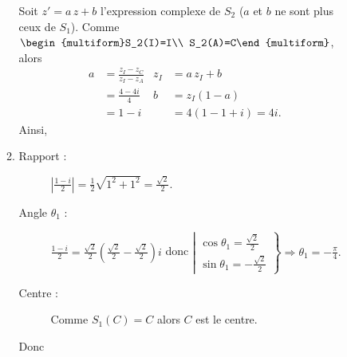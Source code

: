 \begin{description}
\begin{enumerate}
\begin{enumerate}
												Soit $z' = a\, z + b$ l'expression complexe de $S_2$ ($a$ et $b$ ne sont plus ceux de $S_1$).
												Comme 
												$\begin{multiform}S_2(I)=I\\ S_2(A)=C\end{multiform}$, 
												alors
												\begin{align*}
												a	& = \frac{z_I - z_C}{z_I - z_A}		& z_I & = a \, z_I + b 		\\
													& = \frac{4-4i}{4}							& b 	& = z_I ( 1 - a)		\\
													& = 1-i										&  		& = 4 (1-1+i) = 4i		.
												\end{align*}
												Ainsi, 
									\item {}\vspace{-1\baselineskip}
												\begin{description}
													\item[Rapport :] 
														$\left|\frac{1-i}{2}\right| = \frac{1}{2}\sqrt{1^2 + 1^2} = \frac{\sqrt{2}}{2}$.
													\item[Angle $\theta_1$ :]
														$\frac{1-i}{2}=\frac{\sqrt{2}}{2}\left(\frac{\sqrt{2}}{2}-\frac{\sqrt{2}}{2}\right)i$
														donc 
														$\left|
														\begin{matrix}
															\cos \theta_1 = \frac{\sqrt{2}}{2}	\\
															\sin \theta_1 = -\frac{\sqrt{2}}{2}
														\end{matrix}
														\right\rbrace 
														\Rightarrow
														\theta_1 = -\frac{\pi}{4}.
														$
													\item[Centre :] Comme $S_1(C) = C$ alors $C$ est le centre.
												\end{description}
												Donc 
												

\end{enumerate}
\end{enumerate}
\end{description}
